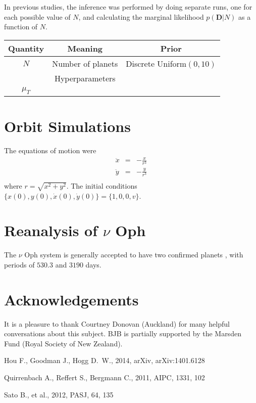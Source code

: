 \documentclass[useAMS,usenatbib]{mn2e}
\begin{document}
In previous studies, the inference was performed by doing separate runs, one
for each possible value of $N$, and calculating the marginal likelihood
$p(\boldsymbol{D} | N)$ as a function of $N$.

\begin{table*}
\begin{tabular}{|c|c|c|}
\hline
Quantity	&	Meaning		& Prior\\
\hline
$N$		& Number of planets	& Discrete Uniform$(0, 10)$\\
\hline
		&	Hyperparameters	&	\\
$\mu_T$		&			&	\\
\end{tabular}
\end{table*}

\section{Orbit Simulations}

The equations of motion were
\begin{eqnarray}
\ddot{x} &=& -\frac{x}{r^3} \\
\ddot{y} &=& -\frac{y}{r^3} \\
\end{eqnarray}
where $r = \sqrt{x^2 + y^2}$. The initial conditions
$\{x(0), y(0), \dot{x}(0), \dot{y}(0)\} = \{1, 0, 0, v\}$.

\section{Reanalysis of $\nu$ Oph}
The $\nu$ Oph system is generally accepted to have two confirmed planets
\citep[e.g.][]{2011AIPC.1331..102Q, 2012PASJ...64..135S, fengji}, with periods
of $530.3$ and $3190$ days.

\vspace{-0.5cm}
\section*{Acknowledgements}
It is a pleasure to thank Courtney Donovan (Auckland) for many helpful
conversations about this subject. BJB is partially
supported by the Marsden Fund (Royal Society of New Zealand).

\begin{thebibliography}{99}
 Hou F., Goodman J., Hogg D.~W., 2014, arXiv, arXiv:1401.6128 

 Quirrenbach A., Reffert S., Bergmann C., 2011, AIPC, 1331, 102 

Sato B., et al., 2012, PASJ, 64, 135 
\end{thebibliography}
\end{document}
